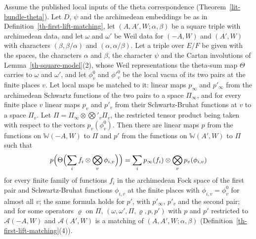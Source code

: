 \begin{lemma}\label{th-bottom-split-assembly}
Assume the published local inputs of the theta correspondence
(Theorem~\ref{lit-bundle-theta}). Let $D$, $\psi$ and the archimedean
embeddings be as in Definition~\ref{th-first-lift-matching}, let
$(A,A',W;\alpha,\beta)$ be a square triple with archimedean data, and let
$\omega$ and $\omega'$ be Weil data for $(-A,W)$ and $(A',W)$ with characters
$(\beta,\beta/\alpha)$ and $(\alpha,\alpha/\beta)$. Let a triple over $E/F$ be
given with the spaces, the characters $\alpha$ and $\beta$, the character
$\psi$ and the Cartan involutions of Lemma~\ref{th-square-model}(2), whose
Weil representations the theta-sum map $\Theta$ carries to $\omega$ and
$\omega'$, and let $\phi^0_v$ and $\phi'^0_v$ be the local vacua of its two
pairs at the finite places $v$. Let local maps be matched to it: linear maps
$p_\infty$ and $p'_\infty$ from the archimedean Schwartz functions of the two
pairs to a space $\Pi_\infty$, and for every finite place $v$ linear maps $p_v$
and $p'_v$ from their Schwartz-Bruhat functions at $v$ to a space $\Pi_v$. Let
$\Pi=\Pi_\infty\otimes\bigotimes'_v\Pi_v$, the restricted tensor product being
taken with respect to the vectors $p_v(\phi^0_v)$. Then there are linear maps
$p$ from the functions on $\mathbb W(-A,W)$ to $\Pi$ and $p'$ from the
functions on $\mathbb W(A',W)$ to $\Pi$ such that
\[
p\Bigl(\Theta\Bigl(\sum_if_i\otimes\bigotimes_v\phi_{i,v}\Bigr)\Bigr)
=\sum_ip_\infty(f_i)\otimes\bigotimes_vp_v(\phi_{i,v})
\]
for every finite family of functions $f_i$ in the archimedean Fock space of
the first pair and Schwartz-Bruhat functions $\phi_{i,v}$ at the finite places
with $\phi_{i,v}=\phi^0_v$ for almost all $v$; the same formula holds for $p'$,
with $p'_\infty$, $p'_v$ and the second pair; and for some operators $\varrho$
on $\Pi$, $(\omega,\omega',\Pi,\varrho,p,p')$ with $p$ and $p'$ restricted to
$\mathcal A(-A,W)$ and $\mathcal A(A',W)$ is a matching of
$(A,A',W;\alpha,\beta)$ (Definition~\ref{th-first-lift-matching}(4)).
\end{lemma}
